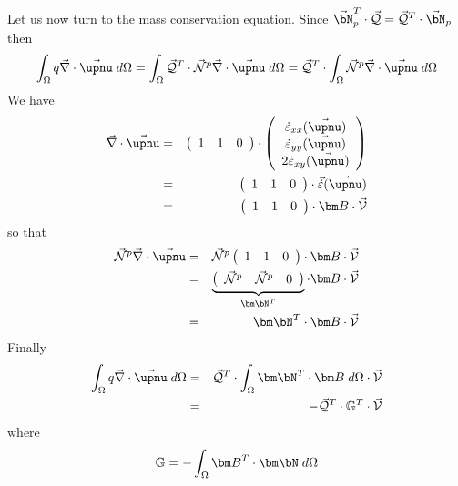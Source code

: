 Let us now turn to the mass conservation equation.
Since $\vec{\bN}_p^T \cdot \vec{\cal Q}= \vec{\cal Q}^T \cdot \vec{\bN}_p$ then
\[
\int_\Omega q \vec\nabla \cdot \vec{\upnu} \; d\Omega 
=\int_\Omega \vec{\cal Q}^T \cdot \vec{\cal N}^p \vec\nabla \cdot \vec{\upnu} \; d\Omega  
=\vec{\cal Q}^T \cdot \int_\Omega \vec{\cal N}^p \vec\nabla \cdot \vec{\upnu} \; d\Omega  
\]
We have 
\begin{eqnarray}
\vec\nabla \cdot \vec{\upnu} 
&=& 
\left(
\begin{array}{ccc}
1 & 1  & 0 
\end{array}
\right)
\cdot
\left(
\begin{array}{c}
\dot \varepsilon_{xx}(\vec\upnu) \\
\dot \varepsilon_{yy}(\vec\upnu) \\
2\dot \varepsilon_{xy}(\vec\upnu)
\end{array}
\right) \nonumber\\
&=&
\left(
\begin{array}{ccc}
1 & 1 & 0 
\end{array}
\right)
\cdot
\vec{\dot \varepsilon}(\vec\upnu)  \nonumber\\
&=&
\left(
\begin{array}{ccc}
1 & 1 & 0 
\end{array}
\right)
\cdot
{\bm B} \cdot \vec{\cal V}
\end{eqnarray}
so that
\begin{eqnarray}
\vec{\cal N}^p  \vec\nabla \cdot \vec{\upnu}
&=& \vec{\cal N}^p  
\left(
\begin{array}{ccc}
1 & 1 & 0 
\end{array}
\right)
\cdot
{\bm B} \cdot \vec{\cal V} \nonumber\\
&=&
\underbrace{
\left(
\begin{array}{cccccc}
\vec{\cal N}^p & \vec{\cal N}^p & 0 
\end{array}
\right)
}_{{\bm \bN}^T}
\cdot
{\bm B} \cdot \vec{\cal V} \nonumber\\
&=&
{\bm \bN}^T \cdot {\bm B} \cdot \vec{\cal V}
\end{eqnarray}
Finally
\begin{eqnarray}
\int_\Omega q \vec\nabla \cdot \vec{\upnu} \; d\Omega 
&=& \vec{\cal Q}^T \cdot \int_\Omega {\bm \bN}^T \cdot {\bm B} \; d\Omega \cdot \vec{\cal V} \nonumber\\
&=& - \vec{\cal Q}^T \cdot \mathbb{G}^T \cdot \vec{\cal V} 
\end{eqnarray}
where
\[
\mathbb{G} = -\int_\Omega {\bm B}^T \cdot {\bm \bN}\; d\Omega 
\]
